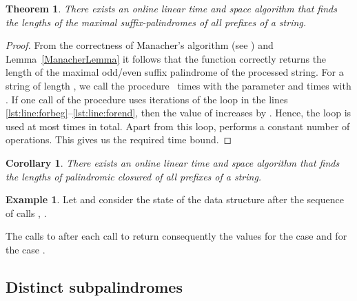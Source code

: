 \documentclass{article}
\theoremstyle{plain}
\newtheorem{theorem}{Theorem}[section]
\newtheorem{corollary}{Corollary}[section]
\theoremstyle{definition}
\newtheorem{example}{Example}[section]
\begin{document}
\begin{algorithmic}[1]
		\State {} \label{lst:line:calcs}
        \State 
		\While{}\label{lst:line:forbeg}
			\State {}\label{lst:line:min}
			\If{}\label{lst:line:breadth}
				\State {}
				\State      {}
			\EndIf
            \State  {}
		\EndWhile\label{lst:line:forend}
		\State 
	\EndProcedure
		\State \Return \label{lst:line:maxpal}
	\EndFunction
\end{algorithmic}

\begin{theorem} \label{PalindromeClosure}
There exists an online linear time and space algorithm that finds the lengths of the maximal suffix-palindromes of all prefixes of a string.
\end{theorem}

\begin{proof}
From the correctness of Manacher's algorithm (see \cite{Man}) and Lemma~\ref{ManacherLemma} it follows that the function  correctly returns the length of the maximal odd/even suffix palindrome of the processed string. For a string of length , we call the procedure \  times with the parameter  and  times with . If one call of the procedure uses  iterations of the loop in the lines \ref{lst:line:forbeg}--\ref{lst:line:forend}, then the value of  increases by . Hence, the loop is used at most  times in total. Apart from this loop,  performs a constant number of operations. This gives us the required  time bound.
\end{proof}

\begin{corollary}
There exists an online linear time and space algorithm that finds the lengths of palindromic closured of all prefixes of a string.
\end{corollary}

\begin{example}
Let  and consider the state of the data structure  after the sequence of calls , .

The calls to  after each call to  return consequently the values  for the case  and  for the case .
\end{example}

\subsection{Distinct subpalindromes} \label{ssec:distinct}
\end{document}

